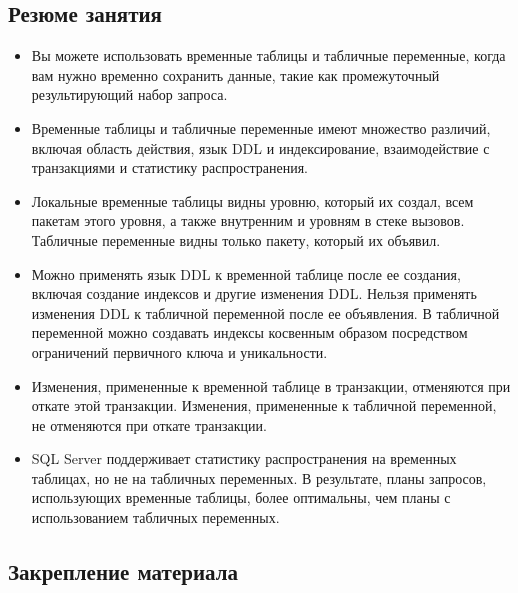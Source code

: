 \subsection*{Резюме занятия}
\begin{itemize}
	\item Вы можете использовать временные таблицы и табличные переменные, когда
	вам нужно временно сохранить данные, такие как промежуточный результирующий набор запроса. 
	\item Временные таблицы и табличные переменные имеют множество различий,
	включая область действия, язык DDL и индексирование, взаимодействие с транзакциями и статистику распространения. 
	\item Локальные временные таблицы видны уровню, который их создал, всем пакетам
	этого уровня, а также внутренним и уровням в стеке вызовов. Табличные переменные видны только пакету, который их объявил. 
	\item Можно применять язык DDL к временной таблице после ее создания, включая
	создание индексов и другие изменения DDL. Нельзя применять изменения DDL
	к табличной переменной после ее объявления. В табличной переменной можно
	создавать индексы косвенным образом посредством ограничений первичного
	ключа и уникальности. 
	\item Изменения, примененные к временной таблице в транзакции, отменяются при
	откате этой транзакции. Изменения, примененные к табличной переменной, не
	отменяются при откате транзакции. 
	\item SQL Server поддерживает статистику распространения на временных таблицах,
	но не на табличных переменных. В результате, планы запросов, использующих
	временные таблицы, более оптимальны, чем планы с использованием табличных
	переменных. 
\end{itemize}


\subsection*{Закрепление материала}

